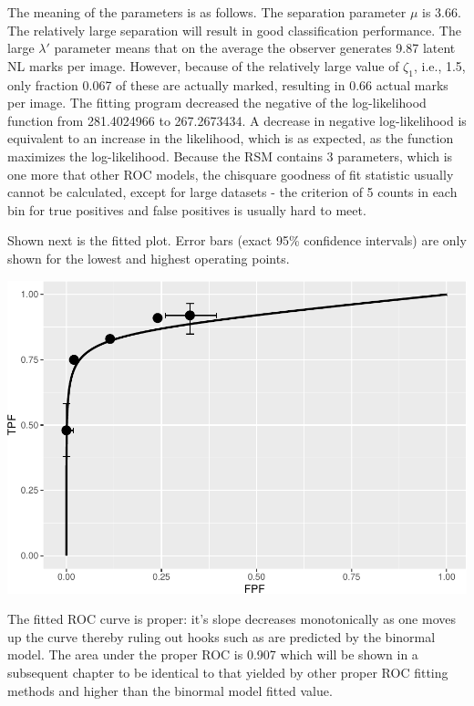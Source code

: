 \documentclass[
]{book}
\newenvironment{Shaded}{\begin{snugshade}}{\end{snugshade}}
\newcommand{\KeywordTok}[1]{\textcolor[rgb]{0.13,0.29,0.53}{\textbf{#1}}}
\newcommand{\NormalTok}[1]{#1}
\newcommand{\OperatorTok}[1]{\textcolor[rgb]{0.81,0.36,0.00}{\textbf{#1}}}
\begin{document}
The meaning of the parameters is as follows. The separation parameter \(\mu\) is 3.66. The relatively large separation will result in good classification performance. The large \(\lambda'\) parameter means that on the average the observer generates 9.87 latent NL marks per image. However, because of the relatively large value of \(\zeta_1\), i.e., 1.5, only fraction 0.067 of these are actually marked, resulting in 0.66 actual marks per image. The fitting program decreased the negative of the log-likelihood function from 281.4024966 to 267.2673434. A decrease in negative log-likelihood is equivalent to an increase in the likelihood, which is as expected, as the function maximizes the log-likelihood. Because the RSM contains 3 parameters, which is one more that other ROC models, the chisquare goodness of fit statistic usually cannot be calculated, except for large datasets - the criterion of 5 counts in each bin for true positives and false positives is usually hard to meet.

Shown next is the fitted plot. Error bars (exact 95\% confidence intervals) are only shown for the lowest and highest operating points.

\begin{Shaded}
\end{Shaded}

\includegraphics{19a-rsm-fitting_files/figure-latex/unnamed-chunk-2-1.pdf}

The fitted ROC curve is proper: it's slope decreases monotonically as one moves up the curve thereby ruling out hooks such as are predicted by the binormal model. The area under the proper ROC is 0.907 which will be shown in a subsequent chapter to be identical to that yielded by other proper ROC fitting methods and higher than the binormal model fitted value.
\end{document}
